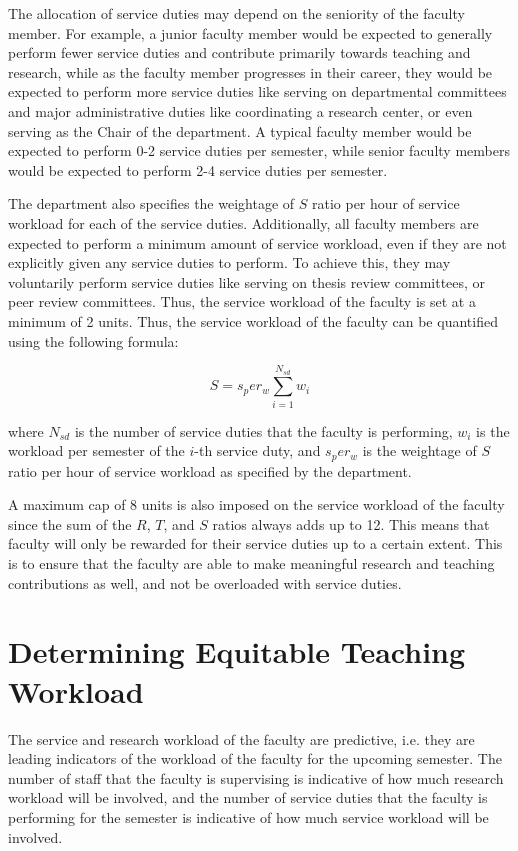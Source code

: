 The allocation of service duties may depend on the seniority of the faculty member. For example, a junior faculty member would be expected to generally perform fewer service duties and contribute primarily towards teaching and research, while as the faculty member progresses in their career, they would be expected to perform more service duties like serving on departmental committees and major administrative duties like coordinating a research center, or even serving as the Chair of the department. A typical faculty member would be expected to perform 0-2 service duties per semester, while senior faculty members would be expected to perform 2-4 service duties per semester.

The department also specifies the weightage of $S$ ratio per hour of service workload for each of the service duties. Additionally, all faculty members are expected to perform a minimum amount of service workload, even if they are not explicitly given any service duties to perform. To achieve this, they may voluntarily perform service duties like serving on thesis review committees, or peer review committees. Thus, the service workload of the faculty is set at a minimum of 2 units. Thus, the service workload of the faculty can be quantified using the following formula:

\begin{equation}
  S = s_per_w \sum_{i=1}^{N_{sd}} w_i
\end{equation}

where $N_{sd}$ is the number of service duties that the faculty is performing, $w_i$ is the workload per semester of the $i$-th service duty, and $s_per_w$ is the weightage of $S$ ratio per hour of service workload as specified by the department.

A maximum cap of 8 units is also imposed on the service workload of the faculty since the sum of the $R$, $T$, and $S$ ratios always adds up to 12. This means that faculty will only be rewarded for their service duties up to a certain extent. This is to ensure that the faculty are able to make meaningful research and teaching contributions as well, and not be overloaded with service duties.

\section{Determining Equitable Teaching Workload}
\label{sec:determining_equitable_teaching_workload}

The service and research workload of the faculty are predictive, i.e. they are leading indicators of the workload of the faculty for the upcoming semester. The number of staff that the faculty is supervising is indicative of how much research workload will be involved, and the number of service duties that the faculty is performing for the semester is indicative of how much service workload will be involved.

